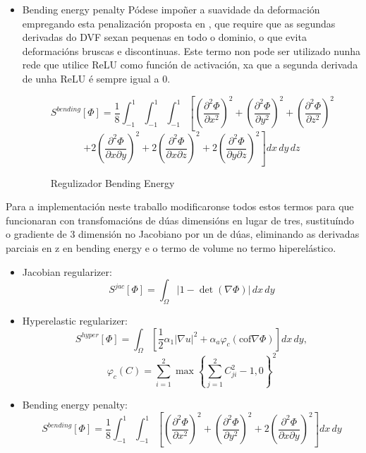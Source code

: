 \begin{itemize}
    \item Bending energy penalty
    Pódese impoñer a suavidade da deformación empregando esta penalización proposta en \cite{bendingenergy}, que 
    require que as segundas derivadas do DVF sexan pequenas en todo o dominio, o que evita deformacións bruscas e discontinuas.
    Este termo non pode ser utilizado nunha rede que utilice ReLU como función de activación, xa que a segunda derivada de unha ReLU é sempre igual a 0.

    \begin{figure}[tbp]
        \centering
        \[
        S^{bending}[\Phi] = \frac{1}{8} \int_{-1}^{1} \int_{-1}^{1} \int_{-1}^{1} \left[ \left( \frac{\partial^2 \Phi}{\partial x^2} \right)^2 + \left( \frac{\partial^2 \Phi}{\partial y^2} \right)^2 + \left( \frac{\partial^2 \Phi}{\partial z^2} \right)^2 \right.
        \]
        \[
        \left. + 2 \left( \frac{\partial^2 \Phi}{\partial x \partial y} \right)^2 + 2 \left( \frac{\partial^2 \Phi}{\partial x \partial z} \right)^2 + 2 \left( \frac{\partial^2 \Phi}{\partial y \partial z} \right)^2 \right] dx\,dy\,dz
        \]
        \caption{Regulizador Bending Energy}
    \end{figure}
    
\end{itemize}

Para a implementación neste traballo modificaronse todos estos termos para que funcionaran con transfomacións de dúas dimensións en lugar de tres,
 sustituíndo o gradiente de 3 dimensión no Jacobiano por un de dúas, eliminando as derivadas parciais en z en bending energy e o termo de volume no termo hiperelástico.

\begin{itemize}
    \item Jacobian regularizer:\\
    \[
    S^{jac}[\Phi] = \int_{\Omega} \left| 1 - \det \left( \nabla \Phi \right) \right| \, dx \, dy
    \]
    \item Hyperelastic regularizer:\\
    \[
    S^{hyper}[\Phi] = \int_{\Omega} \left[ \frac{1}{2} \alpha_1 |\nabla u|^2 + \alpha_a \varphi_c (\text{cof} \nabla \Phi) \right] dx \, dy,
    \]
    \[
    \varphi_c(C) = \sum_{i=1}^2 \max \left\{ \sum_{j=1}^2 C_{ji}^2 - 1, 0 \right\}^2
    \]
    \item Bending energy penalty:\\
    \[
    S^{bending}[\Phi] = \frac{1}{8} \int_{-1}^{1} \int_{-1}^{1} \left[ \left( \frac{\partial^2 \Phi}{\partial x^2} \right)^2 + \left( \frac{\partial^2 \Phi}{\partial y^2} \right)^2 + 2 \left( \frac{\partial^2 \Phi}{\partial x \partial y} \right)^2 \right] dx \, dy
    \]
\end{itemize}

